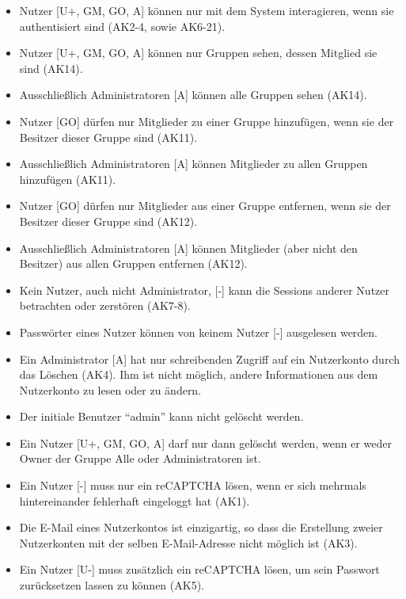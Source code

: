 \documentclass[fontsize=12pt,DIV=14,BCOR=10mm,a4paper,parskip=half-,english,ngerman,bibliography=totocnumbered]{scrreprt}
\begin{document}
\label{security-policies:new_policies}
\begin{itemize}
  \item Nutzer [U+, GM, GO, A] können nur mit dem System interagieren, wenn sie authentisiert sind (AK2-4, sowie AK6-21).
  \item Nutzer [U+, GM, GO, A] können nur Gruppen sehen, dessen Mitglied sie sind (AK14).
  \item Ausschließlich Administratoren [A] können alle Gruppen sehen (AK14).
  \item Nutzer [GO] dürfen nur Mitglieder zu einer Gruppe hinzufügen, wenn sie der Besitzer dieser Gruppe sind (AK11).
  \item Ausschließlich Administratoren [A] können Mitglieder zu allen Gruppen hinzufügen (AK11).
  \item Nutzer [GO] dürfen nur Mitglieder aus einer Gruppe entfernen, wenn sie der Besitzer dieser Gruppe sind (AK12).
  \item Ausschließlich Administratoren [A] können Mitglieder (aber nicht den Besitzer) aus allen Gruppen entfernen (AK12).
  \item Kein Nutzer, auch nicht Administrator, [-] kann die Sessions anderer Nutzer betrachten oder zerstören (AK7-8).
  \item Passwörter eines Nutzer können von keinem Nutzer [-] ausgelesen werden.
  \item Ein Administrator [A] hat nur schreibenden Zugriff auf ein Nutzerkonto durch das Löschen (AK4). Ihm ist nicht möglich, andere Informationen aus dem Nutzerkonto zu lesen oder zu ändern.
  \item Der initiale Benutzer \enquote{admin} kann nicht gelöscht werden.
  \item Ein Nutzer [U+, GM, GO, A] darf nur dann gelöscht werden, wenn er weder Owner der Gruppe Alle oder Administratoren ist.
  \item Ein Nutzer [-] muss nur ein reCAPTCHA lösen, wenn er sich mehrmals hintereinander fehlerhaft eingeloggt hat (AK1).
  \item Die E-Mail eines Nutzerkontos ist einzigartig, so dass die Erstellung zweier Nutzerkonten mit der selben E-Mail-Adresse nicht möglich ist (AK3).
  \item Ein Nutzer [U-] muss zusätzlich ein reCAPTCHA lösen, um sein Passwort zurücksetzen lassen zu können (AK5).
\end{itemize}

\printbibliography

\printacronyms[title=Abkürzungsverzeichnis,toctitle=Abkürzungsverzeichnis]
\printglossary[title=Glossar,toctitle=Glossar,type=main]

\iftotalfigures
  \listoffigures
\fi
\end{document}
